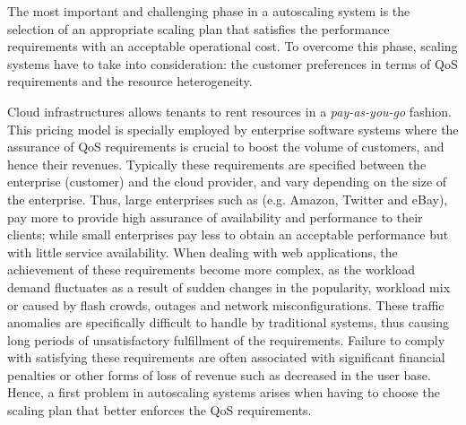 
The most important and challenging phase in a autoscaling system is the selection of an appropriate scaling plan that satisfies the performance requirements with an acceptable operational cost. 
To overcome this phase, scaling systems have to take into consideration: the customer preferences in terms of QoS requirements and the resource heterogeneity.

Cloud infrastructures allows tenants to rent resources in a \emph{pay-as-you-go} fashion. This pricing model is specially employed by enterprise software systems where the assurance of QoS requirements is crucial to boost the volume of customers, and hence their revenues. Typically these requirements are specified between the enterprise (customer) and the cloud provider, and vary depending on the size of the enterprise. Thus, large enterprises such as (e.g. Amazon, Twitter and eBay), pay more to provide high assurance of availability and performance to their clients; while small enterprises pay less to obtain an acceptable performance but with little service availability. When dealing with web applications, the achievement of these requirements become more complex, as the workload demand fluctuates as a result of sudden changes in the popularity, workload mix or caused by flash crowds, outages and network misconfigurations. These traffic anomalies are specifically difficult to handle by traditional systems, thus causing long periods of unsatisfactory fulfillment of the requirements. Failure to comply with satisfying these requirements are often associated with significant financial penalties or other forms of loss of revenue such as decreased in the user base. Hence, a first problem in autoscaling systems arises when having to choose the scaling plan that better enforces the QoS requirements. 


